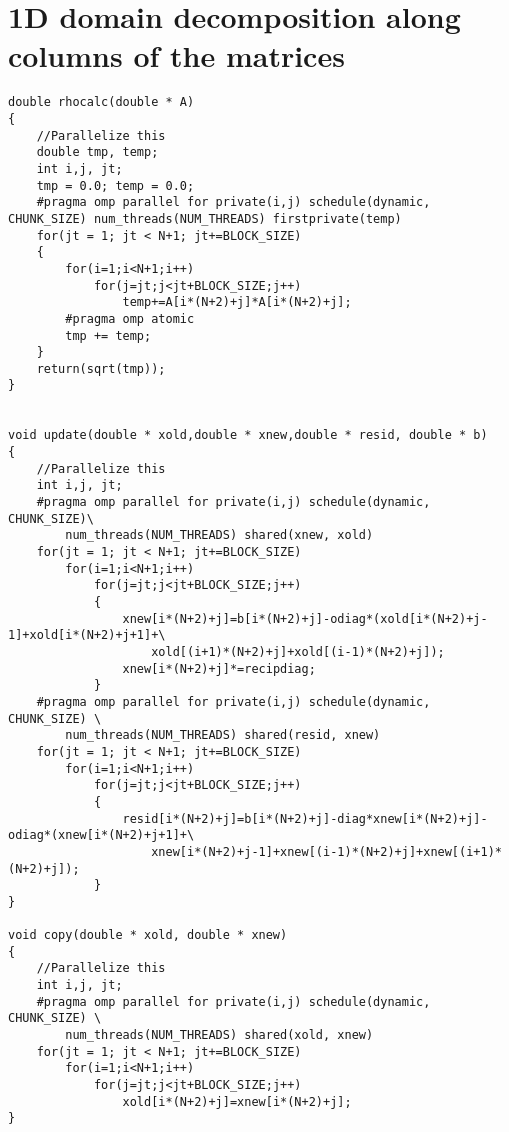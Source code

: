 \documentclass[11pt]{article}
\begin{document}
\section{1D domain decomposition along columns of the matrices}
\begin{lstlisting}
double rhocalc(double * A)
{
	//Parallelize this
	double tmp, temp;
	int i,j, jt;
	tmp = 0.0; temp = 0.0;
	#pragma omp parallel for private(i,j) schedule(dynamic, CHUNK_SIZE) num_threads(NUM_THREADS) firstprivate(temp) 
	for(jt = 1; jt < N+1; jt+=BLOCK_SIZE)
	{
		for(i=1;i<N+1;i++)
			for(j=jt;j<jt+BLOCK_SIZE;j++)
				temp+=A[i*(N+2)+j]*A[i*(N+2)+j];
		#pragma omp atomic
		tmp += temp;
	}
	return(sqrt(tmp));
}


void update(double * xold,double * xnew,double * resid, double * b)
{
	//Parallelize this
	int i,j, jt;
	#pragma omp parallel for private(i,j) schedule(dynamic, CHUNK_SIZE)\
		num_threads(NUM_THREADS) shared(xnew, xold) 
	for(jt = 1; jt < N+1; jt+=BLOCK_SIZE)
		for(i=1;i<N+1;i++)
			for(j=jt;j<jt+BLOCK_SIZE;j++)
			{
				xnew[i*(N+2)+j]=b[i*(N+2)+j]-odiag*(xold[i*(N+2)+j-1]+xold[i*(N+2)+j+1]+\
					xold[(i+1)*(N+2)+j]+xold[(i-1)*(N+2)+j]);
				xnew[i*(N+2)+j]*=recipdiag;
			}
	#pragma omp parallel for private(i,j) schedule(dynamic, CHUNK_SIZE) \
		num_threads(NUM_THREADS) shared(resid, xnew)
	for(jt = 1; jt < N+1; jt+=BLOCK_SIZE)
		for(i=1;i<N+1;i++)
			for(j=jt;j<jt+BLOCK_SIZE;j++)
			{
				resid[i*(N+2)+j]=b[i*(N+2)+j]-diag*xnew[i*(N+2)+j]-odiag*(xnew[i*(N+2)+j+1]+\
					xnew[i*(N+2)+j-1]+xnew[(i-1)*(N+2)+j]+xnew[(i+1)*(N+2)+j]);
			} 
} 
  
void copy(double * xold, double * xnew)
{
	//Parallelize this
	int i,j, jt;
	#pragma omp parallel for private(i,j) schedule(dynamic, CHUNK_SIZE) \
		num_threads(NUM_THREADS) shared(xold, xnew)
	for(jt = 1; jt < N+1; jt+=BLOCK_SIZE)
		for(i=1;i<N+1;i++)
			for(j=jt;j<jt+BLOCK_SIZE;j++)
				xold[i*(N+2)+j]=xnew[i*(N+2)+j];
}
\end{lstlisting}
\end{document}

